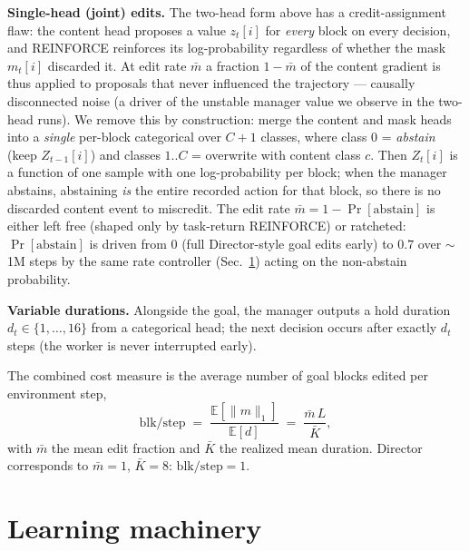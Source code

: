 \documentclass[10pt]{article}
\newcommand{\blkstep}{\mathrm{blk/step}}
\begin{document}
\textbf{Single-head (joint) edits.} The two-head form above has a credit-assignment
flaw: the content head proposes a value $z_t[i]$ for \emph{every} block on every
decision, and REINFORCE reinforces its log-probability regardless of whether the
mask $m_t[i]$ discarded it. At edit rate $\bar m$ a fraction $1-\bar m$ of the
content gradient is thus applied to proposals that never influenced the trajectory
--- causally disconnected noise (a driver of the unstable manager value we observe
in the two-head runs). We remove this by construction: merge the content and mask
heads into a \emph{single} per-block categorical over $C{+}1$ classes, where class
$0$ = \emph{abstain} (keep $Z_{t-1}[i]$) and classes $1..C$ = overwrite with content
class $c$. Then $Z_t[i]$ is a function of one sample with one log-probability per
block; when the manager abstains, abstaining \emph{is} the entire recorded action
for that block, so there is no discarded content event to miscredit. The edit rate
$\bar m = 1-\Pr[\text{abstain}]$ is either left free (shaped only by task-return
REINFORCE) or ratcheted: $\Pr[\text{abstain}]$ is driven from $0$ (full
Director-style goal edits early) to $0.7$ over $\sim$1M steps by the same rate
controller (Sec.~\ref{sec:controllers}) acting on the non-abstain probability.

\textbf{Variable durations.} Alongside the goal, the manager outputs a hold
duration $d_t \in \{1,\dots,16\}$ from a categorical head; the next decision
occurs after exactly $d_t$ steps (the worker is never interrupted early).

The combined cost measure is the average number of goal blocks edited per
environment step,
\begin{equation}
\blkstep \;=\; \frac{\mathbb{E}[\|m\|_1]}{\mathbb{E}[d]}
       \;=\; \frac{\bar{m}\,L}{\bar{K}},
\label{eq:blkstep}
\end{equation}
with $\bar m$ the mean edit fraction and $\bar K$ the realized mean duration.
Director corresponds to $\bar m{=}1$, $\bar K{=}8$: $\blkstep = 1$.

\section{Learning machinery}
\label{sec:controllers}
\end{document}
